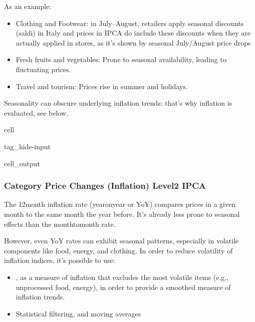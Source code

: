 \documentclass[letterpaper,10pt,english]{jupyterBook}
\begin{document}
\sphinxAtStartPar
As an example:
\begin{itemize}
\item {} 
\sphinxAtStartPar
Clothing and Footwear: in July–August, retailers apply seasonal discounts (saldi) in Italy and prices in IPCA do include these discounts when they are actually applied in stores, as it’s shown by seasonal July/August price drops

\item {} 
\sphinxAtStartPar
Fresh fruits and vegetables: Prone to seasonal availability, leading to fluctuating prices.

\item {} 
\sphinxAtStartPar
Travel and tourism: Prices rise in summer and holidays.

\end{itemize}

\sphinxAtStartPar
Seasonality can obscure underlying inflation trends: that’s why  inflation is evaluated, see below.

\begin{sphinxuseclass}{cell}
\begin{sphinxuseclass}{tag_hide-input}\begin{sphinxVerbatimOutput}

\begin{sphinxuseclass}{cell_output}
\end{sphinxuseclass}\end{sphinxVerbatimOutput}

\end{sphinxuseclass}
\end{sphinxuseclass}

\subsubsection{Category Price Changes (Inflation) \sphinxhyphen{}  Level\sphinxhyphen{}2 IPCA}
\label{\detokenize{code/notebooks/inflation:category-price-changes-inflation-level-2-ipca}}
\sphinxAtStartPar
The 12\sphinxhyphen{}month inflation rate (year\sphinxhyphen{}on\sphinxhyphen{}year or YoY) compares prices in a given month to the same month the year before. It’s already less prone to seasonal effects than the month\sphinxhyphen{}to\sphinxhyphen{}month rate.

\sphinxAtStartPar
However, even YoY rates can exhibit seasonal patterns, especially in volatile components like food, energy, and clothing. In order to reduce volatility of inflation indices, it’s possible to use:
\begin{itemize}
\item {} 
\sphinxAtStartPar
{}, as a measure of inflation that excludes the most volatile items (e.g., unprocessed food, energy), in order to provide a smoothed measure of inflation trends.

\item {} 
\sphinxAtStartPar
Statistical filtering, and moving averages

\end{itemize}
\end{document}
